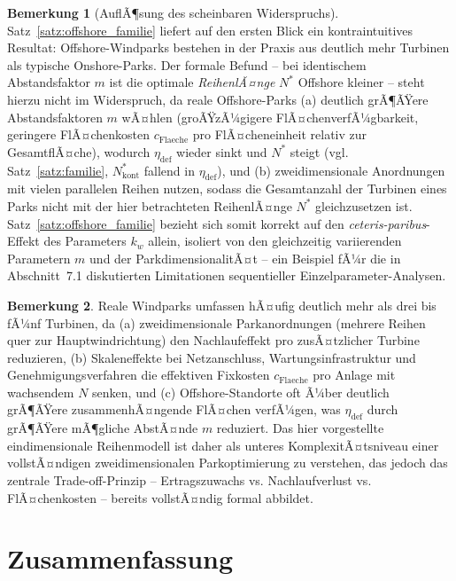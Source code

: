 ﻿\documentclass[a4paper,12pt]{article}
\theoremstyle{definition}
\newtheorem{bemerkung}{Bemerkung}
\begin{document}
\begin{bemerkung}[AuflÃ¶sung des scheinbaren Widerspruchs]
Satz~\ref{satz:offshore_familie} liefert auf den ersten Blick ein kontraintuitives Resultat: Offshore-Windparks bestehen in der Praxis aus deutlich mehr Turbinen als typische Onshore-Parks. Der formale Befund -- bei identischem Abstandsfaktor $m$ ist die optimale \emph{ReihenlÃ¤nge} $N^*$ Offshore kleiner -- steht hierzu nicht im Widerspruch, da reale Offshore-Parks (a) deutlich grÃ¶ÃŸere Abstandsfaktoren $m$ wÃ¤hlen (groÃŸzÃ¼gigere FlÃ¤chenverfÃ¼gbarkeit, geringere FlÃ¤chenkosten $c_{\mathrm{Flaeche}}$ pro FlÃ¤cheneinheit relativ zur GesamtflÃ¤che), wodurch $\eta_{\mathrm{def}}$ wieder sinkt und $N^*$ steigt (vgl. Satz~\ref{satz:familie}, $N^*_{\mathrm{kont}}$ fallend in $\eta_{\mathrm{def}}$), und (b) zweidimensionale Anordnungen mit vielen parallelen Reihen nutzen, sodass die Gesamtanzahl der Turbinen eines Parks nicht mit der hier betrachteten ReihenlÃ¤nge $N^*$ gleichzusetzen ist. Satz~\ref{satz:offshore_familie} bezieht sich somit korrekt auf den \emph{ceteris-paribus}-Effekt des Parameters $k_w$ allein, isoliert von den gleichzeitig variierenden Parametern $m$ und der ParkdimensionalitÃ¤t -- ein Beispiel fÃ¼r die in Abschnitt~7.1 diskutierten Limitationen sequentieller Einzelparameter-Analysen.
\end{bemerkung}

\begin{bemerkung}
Reale Windparks umfassen hÃ¤ufig deutlich mehr als drei bis fÃ¼nf Turbinen, da (a) zweidimensionale Parkanordnungen (mehrere Reihen quer zur Hauptwindrichtung) den Nachlaufeffekt pro zusÃ¤tzlicher Turbine reduzieren, (b) Skaleneffekte bei Netzanschluss, Wartungsinfrastruktur und Genehmigungsverfahren die effektiven Fixkosten $c_{\mathrm{Flaeche}}$ pro Anlage mit wachsendem $N$ senken, und (c) Offshore-Standorte oft Ã¼ber deutlich grÃ¶ÃŸere zusammenhÃ¤ngende FlÃ¤chen verfÃ¼gen, was $\eta_{\mathrm{def}}$ durch grÃ¶ÃŸere mÃ¶gliche AbstÃ¤nde $m$ reduziert. Das hier vorgestellte eindimensionale Reihenmodell ist daher als unteres KomplexitÃ¤tsniveau einer vollstÃ¤ndigen zweidimensionalen Parkoptimierung zu verstehen, das jedoch das zentrale Trade-off-Prinzip -- Ertragszuwachs vs. Nachlaufverlust vs. FlÃ¤chenkosten -- bereits vollstÃ¤ndig formal abbildet.
\end{bemerkung}

\section{Zusammenfassung}
\end{document}
